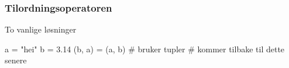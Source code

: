 \begin{frame}[fragile]
    \frametitle{Tilordningsoperatoren}

    To vanlige løsninger

\begin{python}[fragile]
a = "hei"
b = 3.14
(b, a) = (a, b) 
# bruker tupler
# kommer tilbake til dette senere
\end{python}

\end{frame}